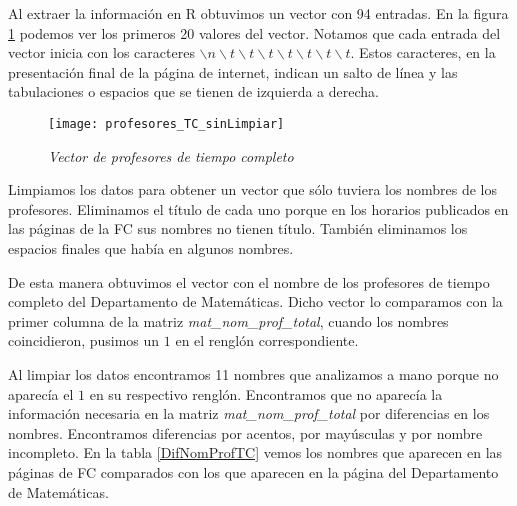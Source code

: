 Al extraer la información en R obtuvimos un vector con 94 entradas. En la figura \ref{profTC_sinLimpiar} podemos ver los primeros 20 valores del vector. Notamos que cada entrada del vector inicia con los caracteres $\backslash n \backslash t \backslash t \backslash t \backslash t \backslash t \backslash t \backslash t$. Estos caracteres, en la presentación final de la página de internet, indican un salto de línea y las tabulaciones o espacios que se tienen de izquierda a derecha.

\begin{figure}[H]
\centering
\texttt{[image: profesores\_TC\_sinLimpiar]} %
\caption{\textit{Vector de profesores de tiempo completo}}\label{profTC_sinLimpiar}
\end{figure}

Limpiamos los datos para obtener un vector que sólo tuviera los nombres de los profesores. Eliminamos el título de cada uno porque en los horarios publicados en las páginas de la FC sus nombres no tienen título. También eliminamos los espacios finales que había en algunos nombres.

De esta manera obtuvimos el vector con el nombre de los profesores de tiempo completo del Departamento de Matemáticas. Dicho vector lo comparamos con la primer columna de la matriz \textit{mat\_nom\_prof\_total}, cuando los nombres coincidieron, pusimos un $1$ en el renglón correspondiente.

Al limpiar los datos encontramos 11 nombres que analizamos a mano porque no aparecía el $1$ en su respectivo renglón. Encontramos que no aparecía la información necesaria en la matriz \textit{mat\_nom\_prof\_total} por diferencias en los nombres. Encontramos diferencias por acentos, por mayúsculas y por nombre incompleto. En la tabla \ref{DifNomProfTC} vemos los nombres que aparecen en las páginas de FC comparados con los que aparecen en la página del Departamento de Matemáticas.

